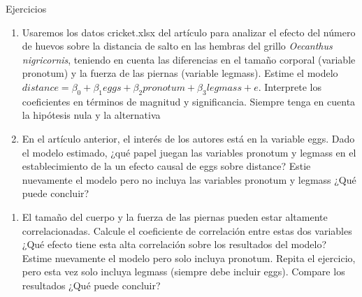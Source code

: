 \documentclass{beamer}
\begin{document}
\begin{frame}{Ejercicios}

\begin{enumerate}[start=3]
    \item Usaremos los datos cricket.xlsx del artículo \cite{ercit} para analizar el efecto del número de huevos sobre la distancia de salto en las hembras del grillo \textit{Oecanthus nigricornis}, teniendo en cuenta las diferencias en el tamaño corporal (variable pronotum) y la fuerza de las piernas (variable legmass). Estime el modelo $distance=\beta_0+\beta_1 eggs + \beta_2 pronotum+\beta_3 legmass+e$. Interprete los coeficientes en términos de magnitud y significancia. Siempre tenga en cuenta la hipótesis nula y la alternativa
    \item En el artículo anterior, el interés de los autores está en la variable eggs. Dado el modelo estimado, ¿qué papel juegan las variables pronotum y legmass en el establecimiento de la un efecto causal de eggs sobre distance? Estie nuevamente el modelo pero no incluya las variables pronotum y legmass ¿Qué puede concluir?

    \end{enumerate}
    \end{frame}
    
    \begin{frame}
    \begin{enumerate}[start=5]
    \item El tamaño del cuerpo y la fuerza de las piernas pueden estar altamente correlacionadas. Calcule el coeficiente de correlación entre estas dos variables ¿Qué efecto tiene esta alta correlación sobre los resultados del modelo? Estime nuevamente el modelo pero solo incluya pronotum. Repita el ejercicio, pero esta vez solo incluya legmass (siempre debe incluir eggs). Compare los resultados ¿Qué puede concluir?
\end{enumerate}
    
\end{frame}


\printbibliography
\end{document}
